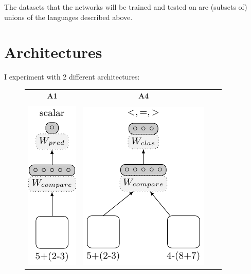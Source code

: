 \documentclass{article}
\begin{document}
The datasets that the networks will be trained and tested on are (subsets of) unions of the languages described above.

\section{Architectures}

I experiment with 2 different architectures:

\begin{figure}[!ht]
\setlength{\tabcolsep}{18pt}
\begin{tabular}{|cc|cc|}
    \hline
    \textbf{A1} & \textbf{A4} \\ %
    & \\
    \includegraphics[scale=0.9]{A1} & 
    \includegraphics[scale=0.9]{A4}\\
\hline
\end{tabular}
\end{figure}
\end{document}
